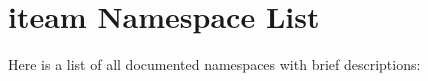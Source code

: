 \section{iteam Namespace List}
Here is a list of all documented namespaces with brief descriptions:\begin{CompactList}
\item{}
\end{CompactList}
